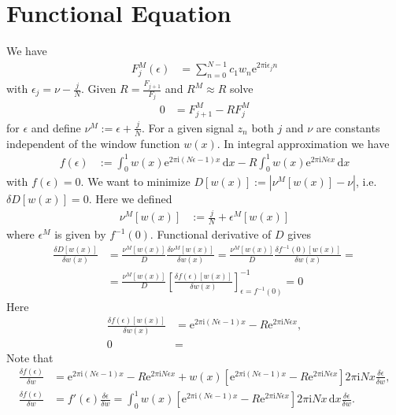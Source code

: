 \documentclass[english, parskip=full]{scrartcl}
\title{\titel}
\author{\autor}
\date{\today}
\newcommand{\intx}{}
\newcommand{\kla}{}
\newcommand{\klam}{}
\renewcommand{\i}{\text{i}}
\newcommand{\e}{\text{e}}
\begin{document}
\maketitle  %


\section{Functional Equation}
We have
\begin{align}
F_j^M(\epsilon) &= \sum_{n=0}^{N-1} c_1w_n \e^{2\pi\i\epsilon_j n}
\end{align}
with $\epsilon_j = \nu - \frac{j}{N}$.
Given $R = \frac{F_{j+1}}{F_{j}}$ and $R^M \approx R$ solve
\begin{align}
0 &= F_{j+1}^M - RF_j^M
\end{align}
for $\epsilon$ and define $\nu^M := \epsilon + \frac{j}{N}$.
For a given signal $z_n$ both $j$ and $\nu $ are constants independent of the window function $w(x)$.
In integral approximation we have
\begin{align}
f(\epsilon) &:= \int_{0}^{1} w(x) \e^{2\pi\i \kla\left( N\epsilon - 1 \right) x} \, \mathrm{d}x - R\intx\int_{0}^{1} w(x) \e^{2\pi\i N\epsilon x}\, \mathrm{d}x
\end{align}
with $f(\epsilon) = 0$.
We want to minimize $D[w(x)] := |\nu^M[w(x)] - \nu|$, i.e. $\delta D[w(x)] = 0$.
Here we defined
\begin{align}
\nu^M[w(x)] &:= \frac{j}{N} + \epsilon^M[w(x)]
\end{align}
where $\epsilon^M$ is given by $f^{-1}(0)$.
Functional derivative of $D$ gives
\begin{align}
\frac{\delta D[w(x)]}{\delta w(x)} &= \frac{\nu^M[w(x)]}{D} \frac{\delta \nu^M [w(x)]}{\delta w(x)} = \frac{\nu^M[w(x)]}{D} \frac{\delta f^{-1}(0) [w(x)]}{\delta w(x)} = \\
&= \frac{\nu^M[w(x)]}{D} \klam\left[ \frac{\delta f(\epsilon) [w(x)]}{\delta w(x)} \right]^{-1}_{\epsilon = f^{-1}(0)} = 0
\end{align}
Here
\begin{align}
\frac{\delta f(\epsilon) [w(x)]}{\delta w(x)} &= \e^{2\pi\i (N\epsilon - 1) x} - R\e^{2\pi\i N\epsilon x},\\
0 &= 
\end{align}
Note that
\begin{align}
\frac{\delta f(\epsilon)}{\delta w} &= \e^{2\pi\i (N\epsilon - 1) x} - R\e^{2\pi\i N\epsilon x} + w(x) \klam\left[ \e^{2\pi\i (N\epsilon - 1) x} - R\e^{2\pi\i N\epsilon x} \right] 2\pi\i N x \frac{\delta \epsilon}{\delta w},\\
\frac{\delta f(\epsilon)}{\delta w} &= f'(\epsilon) \frac{\delta \epsilon}{\delta w} = \int_0^1 w(x) \klam\left[ \e^{2\pi\i (N\epsilon - 1) x} - R\e^{2\pi\i N\epsilon x} \right] 2\pi\i N x\,\mathrm{d}x  \frac{\delta \epsilon}{\delta w}.
\end{align}
\end{document}
